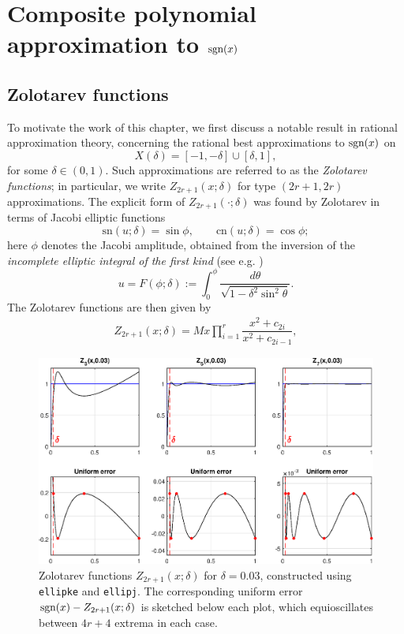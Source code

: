 \chapter{Composite polynomial approximation to \texorpdfstring{$\text{sgn} (x)$}{sgn(x)}}\label{sgnchapter}

\section{Zolotarev functions}

To motivate the work of this chapter, we first discuss a notable result in rational approximation theory, concerning the rational best approximations to $\text{sgn}(x)$ on 
\[X(\delta)=[-1,-\delta]\cup [\delta,1],\] 
for some $\delta \in (0,1)$. Such approximations are referred to as the \textit{Zolotarev functions}; in particular, we write $Z_{2r+1}(x;\delta)$ for type $(2r+1,2r)$ approximations. The explicit form of $Z_{2r+1}(\cdot;\delta)$ was found by Zolotarev \cite{Zolo} in terms of Jacobi elliptic functions
\[\text{sn}(u;\delta)=\sin \phi, \qquad \text{cn}(u;\delta)=\cos \phi;\]
here $\phi$ denotes the Jacobi amplitude, obtained from the inversion of the \textit{incomplete elliptic integral of the first kind} (see e.g. \cite[Chapter 5]{akhiezer})
\[u=F(\phi;\delta):=\int_0^\phi \dfrac{d\theta}{\sqrt{1-\delta^2\sin^2 \theta}}.\]
The Zolotarev functions are then given by
\begin{align}
    Z_{2r+1}(x;\delta)=Mx\prod_{i=1}^r \dfrac{x^2+c_{2i}}{x^2+c_{2i-1}}, \label{zolotarevfn}
\end{align}

\begin{figure}[t!]
\centering
   \includegraphics[width=\textwidth,height=\textheight,keepaspectratio]{figures/chapter_3/ZOLOTAREV.eps}
   \caption{Zolotarev functions $Z_{2r+1}(x;\delta)$ for $\delta=0.03$, constructed using \texttt{ellipke} and \texttt{ellipj}. The corresponding uniform error $\text{sgn}(x)-Z_{2r+1}(x;\delta)$ is sketched below each plot, which equioscillates between $4r+4$ extrema in each case.}
   \label{fig:ZOLOT}
\end{figure}

